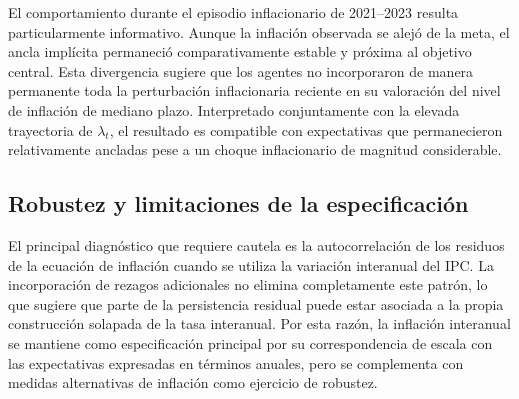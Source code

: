 \documentclass[
  spanish,
  letterpaper,
  DIV=11,
  numbers=noendperiod]{scrartcl}
\begin{document}
El comportamiento durante el episodio inflacionario de 2021--2023
resulta particularmente informativo. Aunque la inflación observada se
alejó de la meta, el ancla implícita permaneció comparativamente estable
y próxima al objetivo central. Esta divergencia sugiere que los agentes
no incorporaron de manera permanente toda la perturbación inflacionaria
reciente en su valoración del nivel de inflación de mediano plazo.
Interpretado conjuntamente con la elevada trayectoria de \(\lambda_t\),
el resultado es compatible con expectativas que permanecieron
relativamente ancladas pese a un choque inflacionario de magnitud
considerable.

\subsection{Robustez y limitaciones de la
especificación}\label{robustez-y-limitaciones-de-la-especificaciuxf3n}

El principal diagnóstico que requiere cautela es la autocorrelación de
los residuos de la ecuación de inflación cuando se utiliza la variación
interanual del IPC. La incorporación de rezagos adicionales no elimina
completamente este patrón, lo que sugiere que parte de la persistencia
residual puede estar asociada a la propia construcción solapada de la
tasa interanual. Por esta razón, la inflación interanual se mantiene
como especificación principal por su correspondencia de escala con las
expectativas expresadas en términos anuales, pero se complementa con
medidas alternativas de inflación como ejercicio de robustez.
\end{document}
